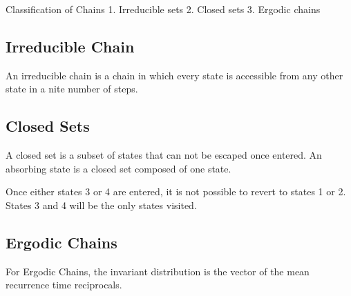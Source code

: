 ﻿Classification of Chains
1. Irreducible sets
2. Closed sets
3. Ergodic chains

\subsection{Irreducible Chain}
An irreducible chain is a chain in which every state is accessible from any other state
in a nite number of steps.


\subsection{Closed Sets}
A closed set is a subset of states that can not be escaped once entered. An absorbing
state is a closed set composed of one state.


Once either states 3 or 4 are entered, it is not possible to
revert to states 1 or 2. States 3 and 4 will be the only states
visited.
\subsection{Ergodic Chains}
For Ergodic Chains, the invariant distribution is the vector of
the mean recurrence time reciprocals.

